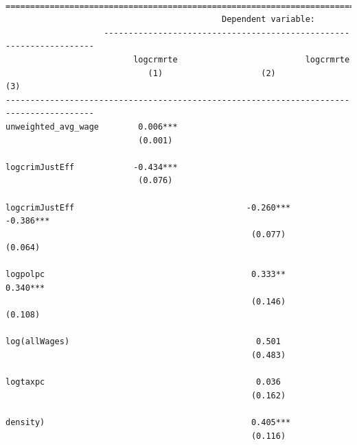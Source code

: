 \documentclass[]{article}
\begin{document}
\begin{verbatim}

========================================================================================
                                            Dependent variable:                         
                    --------------------------------------------------------------------
                          logcrmrte                          logcrmrte                  
                             (1)                    (2)                    (3)          
----------------------------------------------------------------------------------------
unweighted_avg_wage        0.006***                                                     
                           (0.001)                                                      
                                                                                        
logcrimJustEff            -0.434***                                                     
                           (0.076)                                                      
                                                                                        
logcrimJustEff                                   -0.260***              -0.386***       
                                                  (0.077)                (0.064)        
                                                                                        
logpolpc                                          0.333**                0.340***       
                                                  (0.146)                (0.108)        
                                                                                        
log(allWages)                                      0.501                                
                                                  (0.483)                               
                                                                                        
logtaxpc                                           0.036                                
                                                  (0.162)                               
                                                                                        
density)                                          0.405***                              
                                                  (0.116)                               
                                                                                        

\end{verbatim}
\end{document}
